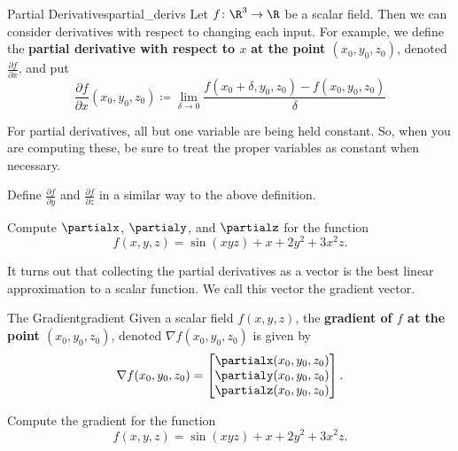         \begin{df}{Partial Derivatives}{partial_derivs}
        Let $f\colon \R^3 \to \R$ be a scalar field.  Then we can consider derivatives with respect to changing each input.  For example, we define the \textbf{partial derivative with respect to $x$} \textbf{at the point $(x_0,y_0,z_0)$}, denoted $\frac{\partial f}{\partial x}$, and put
        \[
        \frac{\partial f}{\partial x}(x_0,y_0,z_0)\coloneqq \lim_{\delta \to 0} \frac{f(x_0+\delta,y_0,z_0)-f(x_0,y_0,z_0)}{\delta}
        \]
        \end{df}
        
        \begin{remark}
        For partial derivatives, all but one variable are being held constant.  So, when you are computing these, be sure to treat the proper variables as constant when necessary.
        \end{remark}
        
        \begin{exercise}
        Define $\frac{\partial f}{\partial y}$ and $\frac{\partial f}{\partial z}$ in a similar way to the above definition.
        \end{exercise}
        
        \begin{exercise}
        Compute $\partialx$, $\partialy$, and $\partialz$ for the function 
        \[
        f(x,y,z)=\sin(xyz)+x+2y^2+3x^2z.
        \]
        \end{exercise}
        
        It turns out that collecting the partial derivatives as a vector is the best linear approximation to a scalar function.  We call this vector the gradient vector.
        
        \begin{df}{The Gradient}{gradient}
        Given a scalar field $f(x,y,z)$, the \textbf{gradient of $f$ at the point $(x_0,y_0,z_0)$}, denoted $\nabla f(x_0,y_0,z_0)$ is given by
        \[
        \nabla f(x_0,y_0,z_0)=\begin{bmatrix} \partialx(x_0,y_0,z_0)\\ \partialy(x_0,y_0,z_0)\\ \partialz(x_0,y_0,z_0)\end{bmatrix}.
        \]
        \end{df}
        
        \begin{exercise}
        Compute the gradient for the function
        \[
        f(x,y,z)=\sin(xyz)+x+2y^2+3x^2z.
        \]
        \end{exercise}
        
